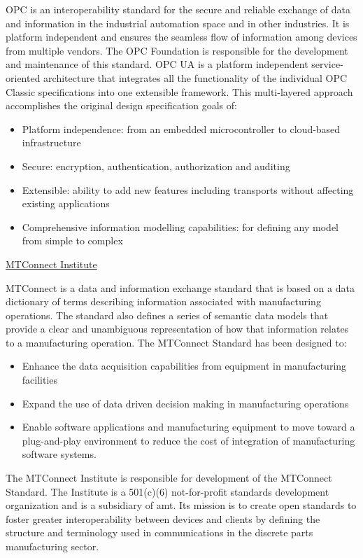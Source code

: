 OPC is an interoperability standard for the secure and reliable exchange of data and information in the industrial automation space and in other industries.  It is platform independent and ensures the seamless flow of information among devices from multiple vendors. The OPC Foundation is responsible for the development and maintenance of this standard.
OPC UA is a platform independent service-oriented architecture that integrates all the functionality of the individual OPC Classic specifications into one extensible framework. This multi-layered approach accomplishes the original design specification goals of:
\begin{itemize}
    \item Platform independence: from an embedded microcontroller to cloud-based infrastructure
    \item Secure: encryption, authentication, authorization and auditing
    \item Extensible: ability to add new features including transports without affecting existing applications
    \item Comprehensive information modelling capabilities: for defining any model from simple to complex 
\end{itemize} 

\quad\underline{MTConnect Institute}

MTConnect is a data and information exchange standard that is based on a data dictionary of terms describing information associated with manufacturing operations.  The standard also defines a series of semantic data models that provide a clear and unambiguous representation of how that information relates to a manufacturing operation.  The MTConnect Standard has been designed to:
\begin{itemize}
    \item Enhance the data acquisition capabilities from equipment in manufacturing facilities
    \item Expand the use of data driven decision making in manufacturing operations
    \item Enable software applications and manufacturing equipment to move toward a plug-and-play environment to reduce the cost of integration of manufacturing software systems.  
\end{itemize}

The MTConnect Institute is responsible for development of the MTConnect Standard.  The Institute is a 501(c)(6) not-for-profit standards development organization and is a subsidiary of \gls{amt}. Its mission is to create open standards to foster greater interoperability between devices and clients by defining the structure and terminology used in communications in the discrete parts manufacturing sector.
